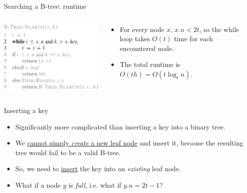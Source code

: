 \documentclass[11pt,t]{beamer}
\begin{document}
	\begin{frame}{Searching a B-tree: runtime}
		\begin{columns}[c]
			\begin{column}{.5\textwidth}
				\includegraphics[width=.9\columnwidth]{images/runtime}
			\end{column}
			\begin{column}{.5\textwidth}
				\begin{itemize}[<+->]
					\item For every node \(x\), \(x.n < 2t\), so the while loop takes \(O(t)\) time for each encountered node.
					\item The total runtime is \(O(th)=O(t \log_t n)\).
				\end{itemize}
			\end{column}
		\end{columns}
	\end{frame}

	\begin{frame}{Inserting a key}
		\begin{itemize}[<+->]
			\item Significantly more complicated than inserting a key into a binary tree.
			\item We \underline{cannot simply \textit{create} a new leaf node} and insert it, because the resulting tree would fail to be a valid B-tree.
			\item So, we need to \underline{insert} the key into an \textit{existing} leaf node.
			\item What if a node \(y\) is \textit{full}, i.e. what if \(y.n = 2t-1\)?
		\end{itemize}
	\end{frame}
\end{document}

